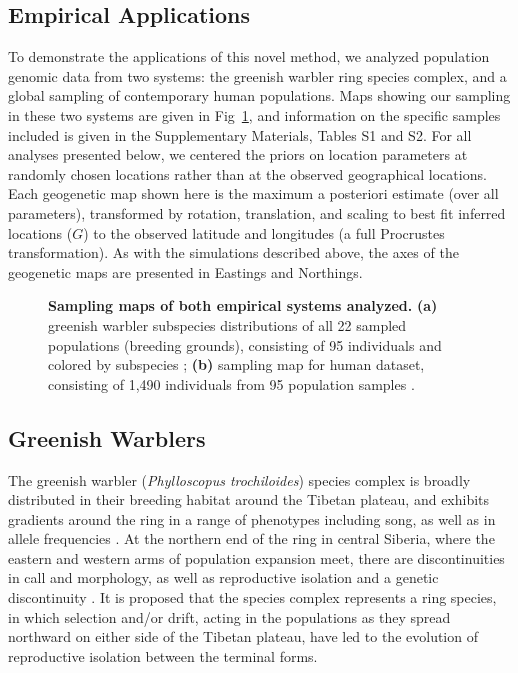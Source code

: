 \documentclass[10pt,letterpaper]{article}
\begin{document}
\subsection*{Empirical Applications}
To demonstrate the applications of this novel method, we analyzed population genomic data from two systems: the greenish warbler ring species complex, and a global sampling of contemporary human populations.  Maps showing our sampling in these two systems are given in Fig\ \ref{sfig:empirical_maps}, and information on the specific samples included is given in the Supplementary Materials, Tables S1 and S2.  
For all analyses presented below, 
we centered the priors on location parameters at randomly chosen locations
rather than at the observed geographical locations.
Each geogenetic map shown here is the maximum a posteriori estimate (over all parameters),
transformed by rotation, translation, and scaling to best fit inferred locations ($G$)
to the observed latitude and longitudes (a full Procrustes transformation).
As with the simulations described above, the axes of the geogenetic maps are presented
in Eastings and Northings.
%
\begin{figure}[ht!]
\begin{center}
\end{center}
\caption{
\textbf{Sampling maps of both empirical systems analyzed.}  
	\textbf{(a)}
	greenish warbler subspecies distributions of all 22 sampled populations (breeding grounds), 
	consisting of 95 individuals and colored by subspecies \cite{alcaide2014genomic}; 
	\textbf{(b)}
	sampling map for human dataset, consisting of 1,490 individuals from 95 population samples \cite{Hellenthal}.
}\label{sfig:empirical_maps}
\end{figure}

\subsection*{Greenish Warblers}  

The greenish warbler (\textit{Phylloscopus trochiloides}) species complex is broadly distributed in their breeding habitat
around the Tibetan plateau, and exhibits gradients around the ring in a range of phenotypes including song, as well as in allele frequencies \cite{ticehurst1938, Irwin2001, Irwin2005}.  At the northern end of the ring in central Siberia, where the eastern and western arms of population expansion meet, there are discontinuities in call and morphology, as well as reproductive isolation and a genetic discontinuity \cite{Irwin2001, Irwin2008}. It is proposed that the species complex represents a ring species, in which selection and/or drift, acting in the populations as they spread northward on either side of the Tibetan plateau, have led to the evolution of reproductive isolation between the terminal forms.
\end{document}
